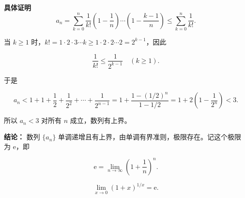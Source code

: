 \documentclass[fontset=fandol]{ctexart}
\newenvironment{custom}[1]{\par\noindent\textbf{#1}\quad}{\par\vspace{0.8em}}
\newcommand{\ee}{\mathrm{e}}
\begin{document}
\begin{custom}{具体证明}
\[	a_n = \sum_{k=0}^{n} \dfrac{1}{k!} \left(1-\dfrac{1}{n}\right)\cdots\left(1-\dfrac{k-1}{n}\right) \leq \sum_{k=0}^{n} \dfrac{1}{k!}.

	\]

	

	当 \(k \geq 1\) 时，\(k! = 1 \cdot 2 \cdot 3 \cdots k \geq 1 \cdot 2 \cdot 2 \cdots 2 = 2^{k-1}\)，因此

	\[

	\dfrac{1}{k!} \leq \dfrac{1}{2^{k-1}} \quad (k \geq 1).

	\]

	

	于是

	\[

	a_n < 1 + 1 + \dfrac{1}{2} + \dfrac{1}{2^2} + \cdots + \dfrac{1}{2^{n-1}} = 1 + \dfrac{1 - (1/2)^n}{1 - 1/2} = 1 + 2\left(1 - \dfrac{1}{2^n}\right) < 3.

	\]

	

	所以 \(a_n < 3\) 对所有 \(n\) 成立，数列有上界。

	

	\noindent\textbf{结论：} 数列 \(\{a_n\}\) 单调递增且有上界，由单调有界准则，极限存在。记这个极限为 \(\ee\)，即

	\[

	\ee = \lim_{n\to\infty} \left(1+\dfrac{1}{n}\right)^n.

	\]

\end{custom}







\begin{theorem}[第二个重要极限]

\[

\lim_{x\to0}(1+x)^{1/x}=\ee.

\]

\end{theorem}
\end{document}
